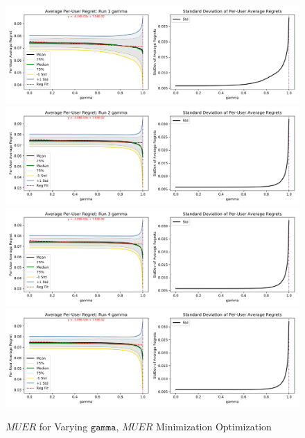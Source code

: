 	\begin{figure}[H]
	\includegraphics[width=1.1\textwidth,center]{figures/opt_param/opt_param_11100_gamma1.png}%
	\newline
	\includegraphics[width=1.1\textwidth,center]{figures/opt_param/opt_param_11100_gamma2.png}%
	\newline
	\includegraphics[width=1.1\textwidth,center]{figures/opt_param/opt_param_11100_gamma3.png}%
	\newline
	\includegraphics[width=1.1\textwidth,center]{figures/opt_param/opt_param_11100_gamma4.png}%
	\caption{$MUER$ for Varying $\mathtt{gamma}$, $MUER$ Minimization Optimization}
	\end{figure}

